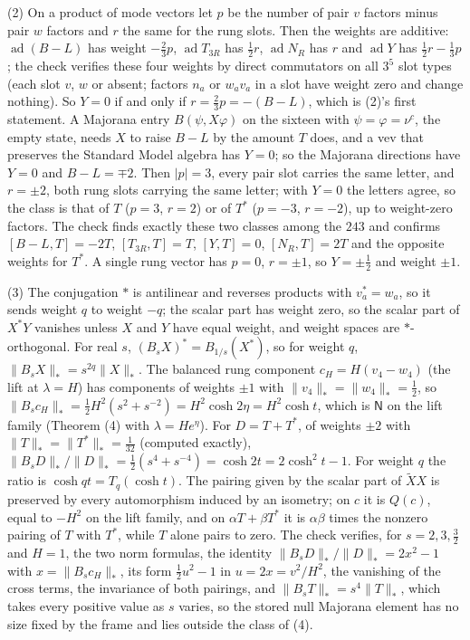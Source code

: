 (2) On a product of mode vectors let $p$ be the number of pair $v$ factors minus pair $w$ factors and $r$ the same for the rung slots. Then the weights are additive: $\operatorname{ad}(B - L)$ has weight $-\tfrac23 p$, $\operatorname{ad} T_{3R}$ has $\tfrac12 r$, $\operatorname{ad} N_{R}$ has $r$ and $\operatorname{ad} Y$ has $\tfrac12 r - \tfrac13 p$; the check verifies these four weights by direct commutators on all $3^{5}$ slot types (each slot $v$, $w$ or absent; factors $n_{a}$ or $w_{a}v_{a}$ in a slot have weight zero and change nothing). So $Y = 0$ if and only if $r = \tfrac23 p = -(B - L)$, which is (2)'s first statement. A Majorana entry $B(\psi, X\varphi)$ on the sixteen with $\psi = \varphi = \nu^{c}$, the empty state, needs $X$ to raise $B - L$ by the amount $T$ does, and a vev that preserves the Standard Model algebra has $Y = 0$; so the Majorana directions have $Y = 0$ and $B - L = \mp 2$. Then $|p| = 3$, every pair slot carries the same letter, and $r = \pm 2$, both rung slots carrying the same letter; with $Y = 0$ the letters agree, so the class is that of $T$ ($p = 3$, $r = 2$) or of $T^{*}$ ($p = -3$, $r = -2$), up to weight-zero factors. The check finds exactly these two classes among the $243$ and confirms $[B - L, T] = -2T$, $[T_{3R}, T] = T$, $[Y, T] = 0$, $[N_{R}, T] = 2T$ and the opposite weights for $T^{*}$. A single rung vector has $p = 0$, $r = \pm 1$, so $Y = \pm\tfrac12$ and weight $\pm 1$.

(3) The conjugation $*$ is antilinear and reverses products with $v_{a}^{*} = w_{a}$, so it sends weight $q$ to weight $-q$; the scalar part has weight zero, so the scalar part of $X^{*}Y$ vanishes unless $X$ and $Y$ have equal weight, and weight spaces are $*$-orthogonal. For real $s$, $(B_{s}X)^{*} = B_{1/s}(X^{*})$, so for weight $q$, $\|B_{s}X\|_{*} = s^{2q}\|X\|_{*}$. The balanced rung component $c_{H} = H(v_{4} - w_{4})$ (the lift at $\lambda = H$) has components of weights $\pm 1$ with $\|v_{4}\|_{*} = \|w_{4}\|_{*} = \tfrac12$, so $\|B_{s}c_{H}\|_{*} = \tfrac12H^{2}(s^{2} + s^{-2}) = H^{2}\cosh 2\eta = H^{2}\cosh t$, which is $\mathsf{N}$ on the lift family (Theorem (4) with $\lambda = He^{\eta}$). For $D = T + T^{*}$, of weights $\pm 2$ with $\|T\|_{*} = \|T^{*}\|_{*} = \tfrac{1}{32}$ (computed exactly), $\|B_{s}D\|_{*}/\|D\|_{*} = \tfrac12(s^{4} + s^{-4}) = \cosh 2t = 2\cosh^{2}t - 1$. For weight $q$ the ratio is $\cosh qt = T_{q}(\cosh t)$. The pairing given by the scalar part of $\widetilde{X}X$ is preserved by every automorphism induced by an isometry; on $c$ it is $Q(c)$, equal to $-H^{2}$ on the lift family, and on $\alpha T + \beta T^{*}$ it is $\alpha\beta$ times the nonzero pairing of $T$ with $T^{*}$, while $T$ alone pairs to zero. The check verifies, for $s = 2, 3, \tfrac32$ and $H = 1$, the two norm formulas, the identity $\|B_{s}D\|_{*}/\|D\|_{*} = 2x^{2} - 1$ with $x = \|B_{s}c_{H}\|_{*}$, its form $\tfrac12 u^{2} - 1$ in $u = 2x = v^{2}/H^{2}$, the vanishing of the cross terms, the invariance of both pairings, and $\|B_{s}T\|_{*} = s^{4}\|T\|_{*}$, which takes every positive value as $s$ varies, so the stored null Majorana element has no size fixed by the frame and lies outside the class of (4).

